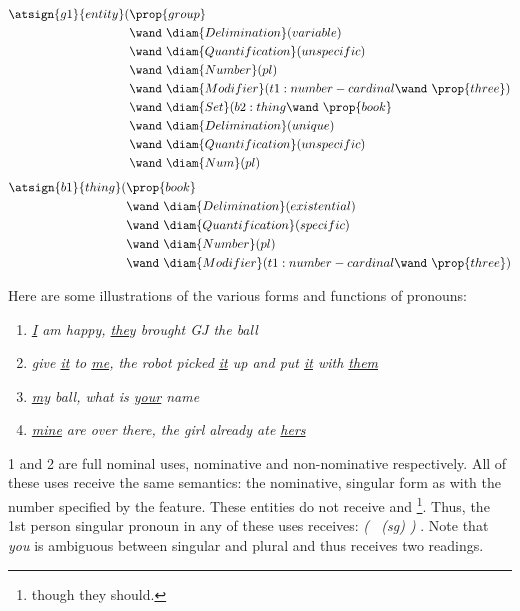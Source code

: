 \begin{align*}
\atsign{g1}{entity}(& \prop{group}  \\ 
      & \wand\ \diam{Delimination}(variable) \\
      & \wand\ \diam{Quantification}(unspecific) \\
      & \wand\ \diam{Number}(pl) \\
      & \wand\ \diam{Modifier}(t1:number-cardinal \wand\ \prop{three}) \\
      & \wand\ \diam{Set}(b2:thing \wand\ \prop{book}\\
      & \wand\ \diam{Delimination}(unique) \\
      & \wand\ \diam{Quantification}(unspecific) \\
      & \wand\ \diam{Num}(pl)\\
\end{align*}
\vspace{-2.5em}
\begin{align*}
\atsign{b1}{thing}(& \prop{book}  \\ 
      & \wand\ \diam{Delimination}(existential) \\
      & \wand\ \diam{Quantification}(specific) \\
      & \wand\ \diam{Number}(pl) \\
      & \wand\ \diam{Modifier}(t1:number-cardinal \wand\ \prop{three}) 
\end{align*}


Here are some illustrations of the various forms and functions of pronouns:
\begin{enumerate}
\item \emph{\ul{I} am happy, \ul{they} brought GJ the ball }
\item \emph{ give \ul{it} to \ul{me}, the robot picked \ul{it} up and put \ul{it} with \ul{them} }
\item \emph{\ul{my} ball, what is \ul{your} name}
\item \emph{\ul{mine} are over there, the girl already ate \ul{hers}}
\end{enumerate}
1 and 2 are full nominal uses, nominative and non-nominative respectively. All of these uses receive the same semantics: the nominative, singular form as  with the number specified by the  feature. These entities do not receive  and  \footnote{though they should.}. Thus, the 1st person singular pronoun in any of these uses receives: \emph{ (  \wand\ (sg) ) }. Note that \emph{you} is ambiguous between singular and plural and thus receives two readings.

